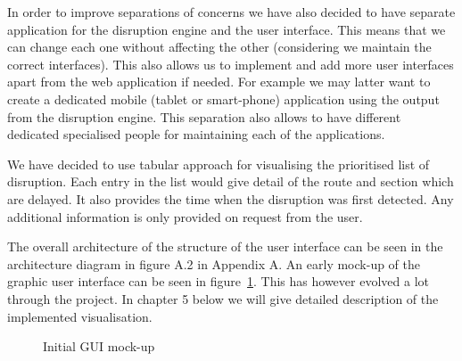In order to improve separations of concerns we have also decided to have separate application for the disruption engine and the user interface. This means that we can change each one without affecting the other (considering we maintain the correct interfaces). This also allows us to implement and add more user interfaces apart from the web application if needed. For example we may latter want to create a dedicated mobile (tablet or smart-phone) application using the output from the disruption engine. This separation also allows to have different dedicated specialised people for maintaining each of the applications.

We have decided to use tabular approach for visualising the prioritised list of disruption. Each entry in the list would give detail of the route and section which are delayed. It also provides the time when the disruption was first detected. Any additional information is only provided on request from the user.

The overall architecture of the structure of the user interface can be seen in the architecture diagram in figure A.2 in Appendix A. An early mock-up of the graphic user interface can be seen in figure~\ref{fig:guiProposal}. This has however evolved a lot through the project. In chapter 5 below we will give detailed description of the implemented visualisation.


\begin{figure}[ht]
	\caption{Initial GUI mock-up}
	\label{fig:guiProposal}
\end{figure}